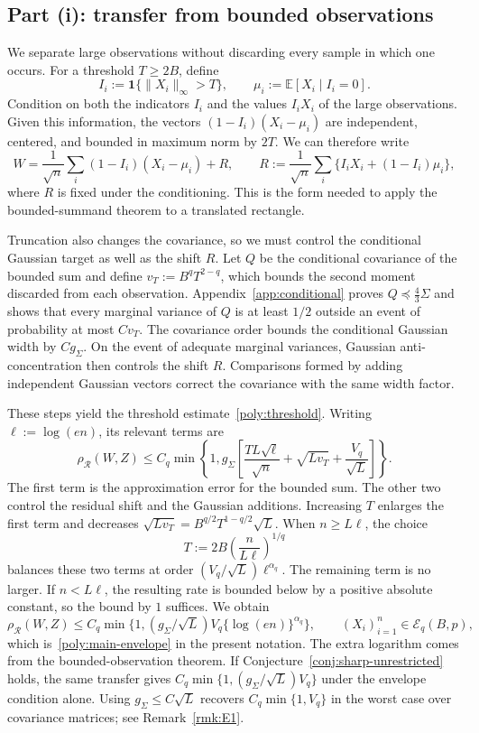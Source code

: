 \documentclass[11pt,letterpaper]{article}
\theoremstyle{remark}
\newcommand{\E}{\mathbb E}
\newcommand{\rh}{\rho_{\mathcal R}}
\newcommand{\ind}{\mathbf 1}
\begin{document}
\subsection{\texorpdfstring{{Part (i): transfer from bounded observations}}{Part (i): transfer from bounded observations}}\label{poly:transfer-sec}

We separate large observations without discarding every sample in
which one occurs. For a threshold $T\ge2B$, define
\[
 I_i:=\ind\{\|X_i\|_\infty>T\},\qquad
 \mu_i:=\E[X_i\mid I_i=0].
\]
Condition on both the indicators $I_i$ and the values $I_iX_i$ of
the large observations. Given this information, the vectors
$(1-I_i)(X_i-\mu_i)$ are independent, centered, and bounded in
maximum norm by $2T$. We can therefore write
\[
 W=\frac1{\sqrt n}\sum_i(1-I_i)(X_i-\mu_i)+R,
 \qquad
 R:=\frac1{\sqrt n}\sum_i\{I_iX_i+(1-I_i)\mu_i\},
\]
where $R$ is fixed under the conditioning. This is the form needed
to apply the bounded-summand theorem to a translated rectangle.

Truncation also changes the covariance, so we must control the
conditional Gaussian target as well as the shift $R$.
Let $Q$ be the conditional covariance of the bounded sum and define
$v_T:=B^qT^{2-q}$, which bounds the second moment discarded from
each observation. Appendix~\ref{app:conditional} proves
$Q\preceq\tfrac43\Sigma$ and shows that every marginal variance
of $Q$ is at least $1/2$ outside an event of probability at most
$Cv_T$. The covariance order bounds the conditional Gaussian width
by $Cg_\Sigma$. On the event of adequate marginal variances,
Gaussian anti-concentration then controls the shift $R$.
Comparisons formed by adding independent Gaussian vectors correct
the covariance with the same width factor.

These steps yield the threshold estimate~\eqref{poly:threshold}.
Writing $\ell:=\log(en)$, its relevant terms are
\[
 \rh(W,Z)\le C_q\min\left\{1,
 g_\Sigma\left[
 \frac{TL\sqrt\ell}{\sqrt n}
 +\sqrt{Lv_T}+\frac{V_q}{\sqrt L}\right]\right\}.
\]
The first term is the approximation error for the bounded sum.
The other two control the residual shift and the Gaussian additions.
Increasing $T$ enlarges the first term and decreases
$\sqrt{Lv_T}=B^{q/2}T^{1-q/2}\sqrt L$.
When $n\ge L\ell$, the choice
\[
 T:=2B\left(\frac n{L\ell}\right)^{1/q}
\]
balances these two terms at order
$(V_q/\sqrt L)\ell^{\alpha_q}$. The remaining term is no larger.
If $n<L\ell$, the resulting rate is bounded below by a positive
absolute constant, so the bound by $1$ suffices. We obtain
\begin{equation}
 \rh(W,Z)\le C_q\min\{1,(g_\Sigma/\sqrt L)
               V_q\{\log(en)\}^{\alpha_q}\},
 \qquad (X_i)_{i=1}^n\in\mathcal E_q(B,p),
 \label{poly:transfer-bound}
\end{equation}
which is~\eqref{poly:main-envelope} in the present notation.
The extra logarithm comes from the bounded-observation theorem.
If Conjecture~\ref{conj:sharp-unrestricted} holds, the same transfer
gives $C_q\min\{1,(g_\Sigma/\sqrt L)V_q\}$ under the envelope
condition alone. Using $g_\Sigma\le C\sqrt L$ recovers
$C_q\min\{1,V_q\}$ in the worst case over covariance matrices; see
Remark~\ref{rmk:E1}.
\end{document}
